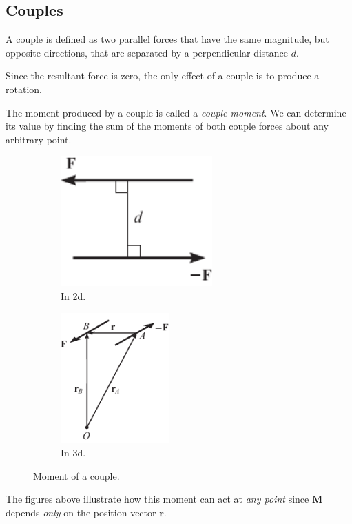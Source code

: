 \documentclass{article}
\begin{document}
\subsection{Couples}
\begin{definition}[Couple]
    A couple is defined as two parallel forces that have the same magnitude,
    but opposite directions, that are separated by a perpendicular distance \(d\).

    Since the resultant force is zero, the only effect of a couple is to
    produce a rotation.
\end{definition}
The moment produced by a couple is called a \textit{couple moment}. We can
determine its value by finding the sum of the moments of both couple forces
about any arbitrary point.
\begin{figure}[H]
    \centering
    \begin{subfigure}[H]{0.49\linewidth}
        \centering
        \includegraphics[height = 5cm, keepaspectratio = true]{figures/couple_2d.pdf}
        \caption{In 2d.}
    \end{subfigure}
    \begin{subfigure}[H]{0.49\linewidth}
        \centering
        \includegraphics[height = 5cm, keepaspectratio = true]{figures/couple.pdf}
        \caption{In 3d.}
    \end{subfigure}
    \caption{Moment of a couple.} %
\end{figure}
The figures above illustrate how this moment can act at \textit{any point}
since \(\symbf{M}\) depends \textit{only} on the position vector \(\symbf{r}\).
\end{document}
